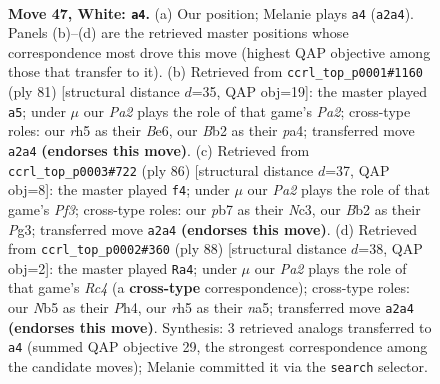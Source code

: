 \documentclass[11pt]{article}
\begin{document}
\clearpage

\begin{figure}[p]\centering
\begin{subfigure}{0.46\textwidth}\centering
\resizebox{\linewidth}{!}{%
\newchessgame
\chessboard[
  setfen={8/1p2pk2/n5pp/pN5r/2p5/2P2PK1/PB1R4/8 w - - 2 47},
  showmover=false,
  pgfstyle=straightmove, color=movearrow, markmove={a2-a4}
]}
\caption{}
\end{subfigure}\hfill
\begin{subfigure}{0.46\textwidth}\centering
\resizebox{\linewidth}{!}{%
\newchessgame
\chessboard[
  setfen={8/p1kp4/4b3/2p5/P1P2R2/2P1K1P1/2PN3r/8 b - - 3 41},
  showmover=false,
  pgfstyle=straightmove, color=movearrow, markmove={a7-a5}
]}
\caption{}
\end{subfigure}
\\[4pt]
\begin{subfigure}{0.46\textwidth}\centering
\resizebox{\linewidth}{!}{%
\newchessgame
\chessboard[
  setfen={5n1R/4kp2/1rp3p1/p7/P2P4/2NK1PP1/8/8 w - - 2 44},
  showmover=false,
  pgfstyle=straightmove, color=movearrow, markmove={f3-f4}
]}
\caption{}
\end{subfigure}\hfill
\begin{subfigure}{0.46\textwidth}\centering
\resizebox{\linewidth}{!}{%
\newchessgame
\chessboard[
  setfen={2N5/1r3pk1/p5p1/n2P3p/2R4P/5P2/6P1/6K1 w - - 0 45},
  showmover=false,
  pgfstyle=straightmove, color=movearrow, markmove={c4-a4}
]}
\caption{}
\end{subfigure}
\caption{\textbf{Move 47, White: \texttt{a4}.} (a) Our position; Melanie plays \texttt{a4} (\texttt{a2a4}). Panels (b)--(d) are the retrieved master positions whose correspondence most drove this move (highest QAP objective among those that transfer to it). (b) Retrieved from \texttt{ccrl\_top\_p0001\#1160} (ply 81) [structural distance $d$=35, QAP obj=19]: the master played \texttt{a5}; under $\mu$ our \emph{Pa2} plays the role of that game's \emph{Pa2}; cross-type roles: our \emph{r}h5 as their \emph{B}e6, our \emph{B}b2 as their \emph{p}a4; transferred move \texttt{a2a4} \textbf{(endorses this move)}. (c) Retrieved from \texttt{ccrl\_top\_p0003\#722} (ply 86) [structural distance $d$=37, QAP obj=8]: the master played \texttt{f4}; under $\mu$ our \emph{Pa2} plays the role of that game's \emph{Pf3}; cross-type roles: our \emph{p}b7 as their \emph{N}c3, our \emph{B}b2 as their \emph{P}g3; transferred move \texttt{a2a4} \textbf{(endorses this move)}. (d) Retrieved from \texttt{ccrl\_top\_p0002\#360} (ply 88) [structural distance $d$=38, QAP obj=2]: the master played \texttt{Ra4}; under $\mu$ our \emph{Pa2} plays the role of that game's \emph{Rc4} (a \textbf{cross-type} correspondence); cross-type roles: our \emph{N}b5 as their \emph{P}h4, our \emph{r}h5 as their \emph{n}a5; transferred move \texttt{a2a4} \textbf{(endorses this move)}. Synthesis: 3 retrieved analogs transferred to \texttt{a4} (summed QAP objective 29, the strongest correspondence among the candidate moves); Melanie committed it via the \texttt{search} selector.}
\label{fig:thought-m92}
\end{figure}
\end{document}
